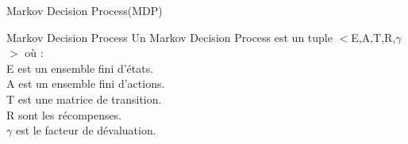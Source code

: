 \begin{frame}{Markov Decision Process(MDP)}{}
	\begin{center}
		\begin{block}{Markov Decision Process}
			Un Markov Decision Process est un tuple $<$E,A,T,R,$\gamma$$>$ où :\\
			E est un ensemble fini d'états.\\
			A est un ensemble fini d'actions.\\
			T est une matrice de transition.\\
			R sont les récompenses.\\
			$\gamma$ est le facteur de dévaluation.
		\end{block}
	\end{center}
\end{frame}

